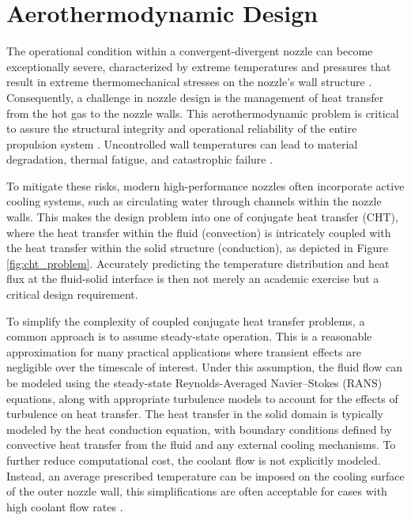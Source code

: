 \documentclass[tg, EN]{ufabcFHZh_tg}
\begin{document}
\section{Aerothermodynamic Design}

The operational condition within a convergent-divergent nozzle can become exceptionally severe, characterized by extreme temperatures and pressures that result in extreme thermomechanical stresses on the nozzle's wall structure \citep{sutton2010, back1964}. Consequently, a challenge in nozzle design is the management of heat transfer from the hot gas to the nozzle walls. This aerothermodynamic problem is critical to assure the structural integrity and operational reliability of the entire propulsion system . Uncontrolled wall temperatures can lead to material degradation, thermal fatigue, and catastrophic failure \citep{back1964}.

To mitigate these risks, modern high-performance nozzles often incorporate active cooling systems, such as circulating water through channels within the nozzle walls. This makes the design problem into one of conjugate heat transfer (CHT), where the heat transfer within the fluid (convection) is intricately coupled with the heat transfer within the solid structure (conduction), as depicted in Figure \ref{fig:cht_problem}. Accurately predicting the temperature distribution and heat flux at the fluid-solid interface is then not merely an academic exercise but a critical design requirement.

To simplify the complexity of coupled conjugate heat transfer problems, a common approach is to assume steady-state operation. This is a reasonable approximation for many practical applications where transient effects are negligible over the timescale of interest. Under this assumption, the fluid flow can be modeled using the steady-state Reynolds-Averaged Navier–Stokes (RANS) equations, along with appropriate turbulence models to account for the effects of turbulence on heat transfer. The heat transfer in the solid domain is typically modeled by the heat conduction equation, with boundary conditions defined by convective heat transfer from the fluid and any external cooling mechanisms. To further reduce computational cost, the coolant flow is not explicitly modeled. Instead, an average prescribed temperature can be imposed on the cooling surface of the outer nozzle wall, this simplifications are often acceptable for cases with high coolant flow rates \citep{Engblom2007}.
\end{document}
